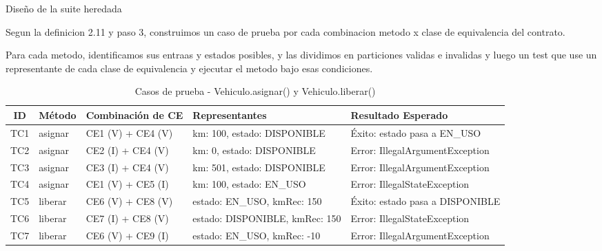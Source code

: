 Diseño de la suite heredada

Segun la definicion 2.11 y paso 3, construimos un caso de prueba por cada combinacion metodo x clase de equivalencia del contrato.

Para cada metodo, identificamos sus entraas y estados posibles, y las dividimos en particiones validas e invalidas y luego un test que use un representante de cada clase de equivalencia y ejecutar el metodo bajo esas condiciones. 

\begin{table}[ht]
    \centering
    \caption{Casos de prueba - Vehiculo.asignar() y Vehiculo.liberar()}
    \label{tab:casos_prueba}
    \begin{tabular}{|c|l|l|l|l|}
        \hline
        ID & Método & Combinación de CE & Representantes & Resultado Esperado \\ 
        \hline
        
        TC1 & asignar & CE1 (V) + CE4 (V) & km: 100, estado: DISPONIBLE & Éxito: estado pasa a EN\_USO \\ 
        \hline
        
        TC2 & asignar & CE2 (I) + CE4 (V) & km: 0, estado: DISPONIBLE & Error: IllegalArgumentException \\ 
        \hline
        
        TC3 & asignar & CE3 (I) + CE4 (V) & km: 501, estado: DISPONIBLE & Error: IllegalArgumentException \\ 
        \hline
        
        TC4 & asignar & CE1 (V) + CE5 (I) & km: 100, estado: EN\_USO & Error: IllegalStateException \\ 
        \hline
        
        TC5 & liberar & CE6 (V) + CE8 (V) & estado: EN\_USO, kmRec: 150 & Éxito: estado pasa a DISPONIBLE \\ 
        \hline
        
        TC6 & liberar & CE7 (I) + CE8 (V) & estado: DISPONIBLE, kmRec: 150 & Error: IllegalStateException \\ 
        \hline
        
        TC7 & liberar & CE6 (V) + CE9 (I) & estado: EN\_USO, kmRec: -10 & Error: IllegalArgumentException \\ 
        \hline
        
    \end{tabular}
\end{table}




